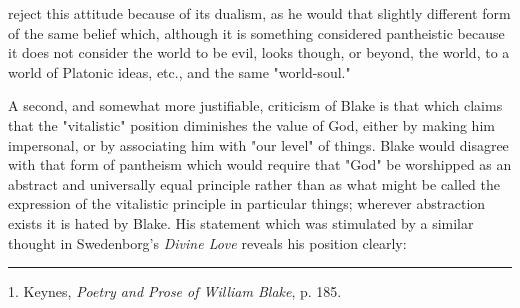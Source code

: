 reject this attitude because of its dualism, as he would that slightly different form of the same belief which, although
it is something considered pantheistic because it does not consider the world to be evil, looks though, or beyond,
the world, to a world of Platonic ideas, etc., and the same "world-soul."\par
\vspace*{0.5\baselineskip}
A second, and somewhat more justifiable, criticism of Blake is that which claims that the "vitalistic" position diminishes
the value of God, either by making him impersonal, or by associating him with "our level" of things. Blake would
disagree with that form of pantheism which would require that "God" be worshipped as an abstract and universally equal principle
rather than as what might be called the expression of the vitalistic principle in particular
things; wherever abstraction exists it is hated by Blake. His statement which was stimulated by a similar thought in 
Swedenborg's \textit{Divine Love} reveals his position clearly:\par
\vspace*{\fill}
\noindent\rule{0.25\textwidth}{0.4pt}\par
1. Keynes, \textit{Poetry and Prose of William Blake}, p. 185.\par

\newpage

